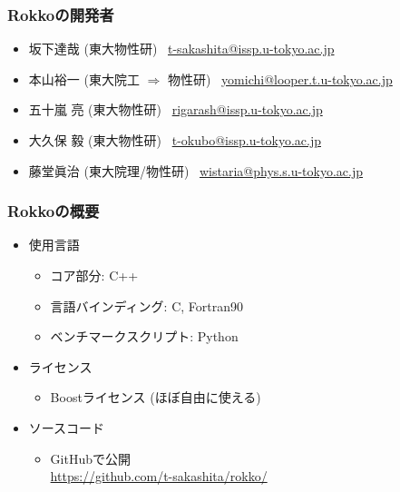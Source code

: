\begin{frame}
  \frametitle{Rokkoの開発者}
  \begin{itemize}
    \setlength{\itemsep}{1em}
  \item 坂下達哉 (東大物性研) \ \href{mailto:t-sakashita@issp.u-tokyo.ac.jp}{t-sakashita@issp.u-tokyo.ac.jp}
  \item 本山裕一 (東大院工 $\Rightarrow $ 物性研) \ \href{mailto:yomichi@looper.u-tokyo.ac.jp}{yomichi@looper.t.u-tokyo.ac.jp}
  \item 五十嵐 亮 (東大物性研) \ \href{mailto:rigarash@issp.u-tokyo.ac.jp}{rigarash@issp.u-tokyo.ac.jp}
  \item 大久保 毅 (東大物性研) \ \href{mailto:t-okubo@issp.u-tokyo.ac.jp}{t-okubo@issp.u-tokyo.ac.jp}
  \item 藤堂眞治 (東大院理/物性研) \ \href{mailto:wistaria@phys.s.u-tokyo.ac.jp}{wistaria@phys.s.u-tokyo.ac.jp}
  \end{itemize}
\end{frame}

\begin{frame}
  \frametitle{Rokkoの概要}
  \begin{itemize}
  \item 使用言語
    \begin{itemize}
    \item コア部分: C++
    \item 言語バインディング: C, Fortran90
    \item ベンチマークスクリプト: Python
    \end{itemize}
  \item ライセンス
    \begin{itemize}
    \item Boostライセンス (ほぼ自由に使える)
    \end{itemize}
  \item ソースコード
    \begin{itemize}
    \item GitHubで公開\\
          \url{https://github.com/t-sakashita/rokko/}
    \end{itemize}
  \end{itemize}
\end{frame}

